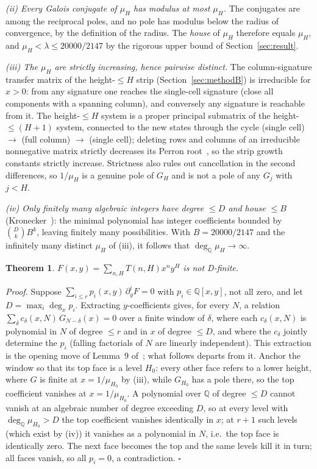 \documentclass[11pt]{article}
\newtheorem{theorem}{Theorem}
\begin{document}
\emph{(ii) Every Galois conjugate of $\mu_H$ has modulus at most $\mu_H$.}
The conjugates are among the reciprocal poles, and no pole has modulus
below the radius of convergence, by the definition of the radius. The
\emph{house} of $\mu_H$ therefore equals
$\mu_H$, and $\mu_H<\lambda\le 20000/2147$ by the rigorous
upper bound of Section~\ref{sec:result}.

\emph{(iii) The $\mu_H$ are strictly increasing, hence pairwise distinct.}
The column-signature transfer matrix of the height-$\le H$ strip
(Section~\ref{sec:methodB}) is irreducible for $x>0$: from any signature
one reaches the single-cell signature (close all components with a
spanning column), and conversely any signature is reachable from it. The
height-$\le H$ system is a proper principal submatrix of the
height-$\le(H{+}1)$ system, connected to the new states through the cycle
(single cell) $\to$ (full column) $\to$ (single cell); deleting
rows and columns of an irreducible nonnegative matrix strictly decreases
its Perron root~\cite{hornjohnson}, so the strip growth constants strictly
increase. Strictness also rules out cancellation in the second
differences, so $1/\mu_H$ is a genuine pole of $G_H$ and is not a pole of
any $G_j$ with $j<H$.

\emph{(iv) Only finitely many algebraic integers have degree $\le D$ and
house $\le B$} (Kronecker~\cite{kronecker}): the minimal polynomial has
integer coefficients bounded by $\binom{D}{k}B^{k}$, leaving finitely many
possibilities. With $B=20000/2147$ and the infinitely many distinct
$\mu_H$ of (iii), it follows that $\deg_{\mathbb Q}\mu_H\to\infty$.

\begin{theorem}
\label{thm:notdfinite}
$F(x,y)=\sum_{n,H}T(n,H)x^ny^H$ is not D-finite.
\end{theorem}

\emph{Proof.} Suppose $\sum_{i\le r}p_i(x,y)\,\partial_y^i F=0$ with
$p_i\in\mathbb Q[x,y]$, not all zero, and let $D=\max_i\deg_x p_i$.
Extracting $y$-coefficients gives, for every $N$, a relation
$\sum_{\delta}c_\delta(x,N)\,G_{N-\delta}(x)=0$ over a finite window of
$\delta$, where each $c_\delta(x,N)$ is polynomial in $N$ of degree $\le r$
and in $x$ of degree $\le D$, and where the $c_\delta$ jointly determine
the $p_i$ (falling factorials of $N$ are linearly independent). This
extraction is the opening move of Lemma~9 of~\cite{bmr2002}; what follows
departs from it. Anchor the
window so that its top face is a level $H_0$: every other face refers to a
lower height, where $G$ is finite at $x=1/\mu_{H_0}$ by (iii), while
$G_{H_0}$ has a pole there, so the top coefficient vanishes at
$x=1/\mu_{H_0}$. A polynomial over $\mathbb Q$ of degree $\le D$ cannot
vanish at an algebraic number of degree exceeding $D$, so at every level
with $\deg_{\mathbb Q}\mu_{H_0}>D$ the top coefficient vanishes
identically in $x$; at $r{+}1$ such levels (which exist by (iv)) it
vanishes as a polynomial in $N$, i.e.\ the top face is identically zero.
The next face becomes the top and the same levels kill it in turn; all
faces vanish, so all $p_i=0$, a contradiction. $\square$
\end{document}
